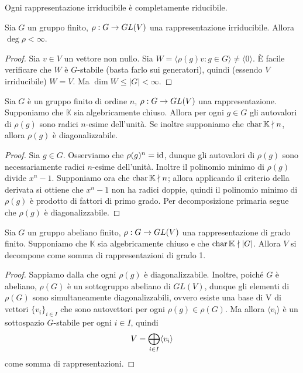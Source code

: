 \begin{example}
Ogni rappresentazione irriducibile è completamente riducibile.
\end{example}

\begin{proposition}
Sia $G$ un gruppo finito, $\rho:G\to GL(V)$ una rappresentazione irriducibile. Allora $\deg\rho<\infty$.
\end{proposition}
\begin{proof}
Sia $v\in V$ un vettore non nullo. Sia $W=\langle\rho(g)v:g\in G\rangle\neq\langle 0\rangle$. È facile verificare che $W$ è $G$-stabile (basta farlo sui generatori), quindi (essendo $V$ irriducibile) $W=V$. Ma $\dim W\le|G|<\infty$.
\end{proof}

\begin{proposition}
Sia $G$ è un gruppo finito di ordine $n$, $\rho:G\to GL(V)$ una rappresentazione. Supponiamo che $\mathbb{K}$ sia algebricamente chiuso. Allora per ogni $g\in G$ gli autovalori di $\rho(g)$ sono radici $n$-esime dell'unità. Se inoltre supponiamo che $\operatorname{char}\mathbb{K}\nmid n$, allora $\rho(g)$ è diagonalizzabile.
\end{proposition}
\begin{proof}
Sia $g\in G$. Osserviamo che $\rho(g)^n=\operatorname{id}$, dunque gli autovalori di $\rho(g)$ sono necessariamente radici $n$-esime dell'unità. Inoltre il polinomio minimo di $\rho(g)$ divide $x^n-1$. Supponiamo ora che $\operatorname{char}\mathbb{K}\nmid n$; allora applicando il criterio della derivata si ottiene che $x^n-1$ non ha radici doppie, quindi il polinomio minimo di $\rho(g)$ è prodotto di fattori di primo grado. Per decomposizione primaria segue che $\rho(g)$ è diagonalizzabile.
\end{proof}

\begin{proposition}
Sia $G$ un gruppo abeliano finito, $\rho:G\to GL(V)$ una rappresentazione di grado finito. Supponiamo che $\mathbb{K}$ sia algebricamente chiuso e che $\operatorname{char}\mathbb{K}\nmid |G|$. Allora $V$ si decompone come somma di rappresentazioni di grado 1.
\end{proposition}
\begin{proof}
Sappiamo dalla  che ogni $\rho(g)$ è diagonalizzabile. Inoltre, poiché $G$ è abeliano, $\rho(G)$ è un sottogruppo abeliano di $GL(V)$, dunque gli elementi di $\rho(G)$ sono simultaneamente diagonalizzabili, ovvero esiste una base di V  di vettori $\{v_i\}_{i\in I}$ che sono autovettori per ogni $\rho(g)\in\rho(G)$. Ma allora $\langle v_i\rangle$ è un sottospazio $G$-stabile per ogni $i\in I$, quindi
$$
V=\bigoplus_{i\in I}\langle v_i\rangle
$$
come somma di rappresentazioni.
\end{proof}

